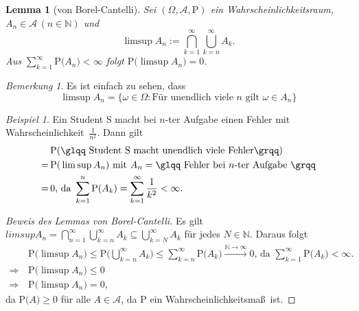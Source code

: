 \documentclass[a4paper,12pt,fleqn]{scrartcl}
\newcommand{\N}{\mathbb{N}}
\newcommand{\m}[1]{\mathcal{ #1 }}
\newcommand{\p}[1]{\text{P(} #1 \text{)}}
\newcommand{\WR}{Wahrscheinlichkeitsraum}
\newcommand{\WM}{Wahrscheinlichkeitsmaß}
\newcommand{\Wk}{Wahrscheinlichkeit}
\newcommand{\impl}{\Rightarrow}
\theoremstyle{definition}
\theoremstyle{plain}
\newtheorem*{lemma*}{Lemma}
\theoremstyle{remark}
\newtheorem*{bemerkung}{Bemerkung}
\newtheorem*{beispiel*}{Beispiel}
\begin{document}
\begin{lemma*}[von Borel-Cantelli]
Sei $(\Omega, \m{A}, \text{P})$ ein \WR, $A_n \in \m{A} \, (n \in \N)$ und 
\[\limsup A_n := \bigcap_{k=1}^\infty \bigcup_{k=n}^\infty A_k.\]
Aus $\sum_{k=1}^\infty \p{A_n} < \infty$ folgt $\p{\limsup A_n} = 0$.
\end{lemma*}
\begin{bemerkung}
Es ist einfach zu sehen, dass
\[\limsup A_n = \{\omega \in \Omega : \text{Für unendlich viele } n \text{ gilt } \omega \in A_n\}\]
\end{bemerkung}
\begin{beispiel*}
Ein Student S macht bei $n$-ter Aufgabe einen Fehler mit \Wk \, $\frac{1}{n^2}$. Dann gilt
\begin{align*}
&\p{\text{\glqq Student S macht unendlich viele Fehler\grqq}} \\
= \, &\p{\limsup A_n} \text{ mit } A_n = \text{\glqq Fehler bei } n \text{-ter Aufgabe \grqq} \\
= \, &0 \text{, da } \sum_{k=1}^n \p{A_k} = \sum_{k=1}^\infty \frac{1}{k^2} < \infty.
\end{align*}
\end{beispiel*}
\begin{proof}[Beweis des Lemmas von Borel-Cantelli]
Es gilt $limsup A_n = \bigcap_{n=1}^\infty \bigcup_{k=n}^\infty A_k \subseteq \bigcup_{k=N}^\infty A_k$ für jedes $N \in \N$. Daraus folgt
\begin{align*}
&\p{\limsup A_n} \leq \p{\bigcup_{k=n}^\infty A_k} \leq \sum_{k=n}^\infty \p{A_k} \stackrel{\N \rightarrow \infty}{\rightarrow} 0 \text{, da } \sum_{k=1}^\infty \p{A_k} < \infty. \\
\impl \, &\p{\limsup A_n} \leq 0 \\
\impl \, &\p{\limsup A_n} = 0,
\end{align*}
da $\p{A} \geq 0$ für alle $A \in \m{A}$, da P ein \WM \, ist.
\end{proof}
\end{document}
